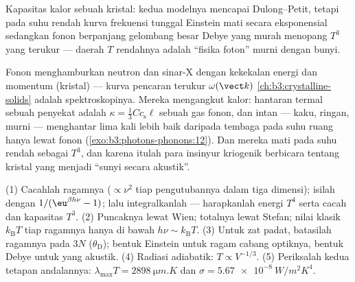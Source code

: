 \begin{omfigure}

{\small Kapasitas kalor sebuah kristal: kedua modelnya mencapai
Dulong--Petit, tetapi pada suhu rendah kurva frekuensi tunggal Einstein
mati secara eksponensial sedangkan fonon berpanjang gelombang besar
Debye yang murah menopang $T^3$ yang terukur --- daerah $T$ rendahnya
adalah ``fisika foton'' murni dengan bunyi.}
\end{omfigure}

\begin{example}\label{ex:b3:photons-phonons:phonon-real}
Fonon menghamburkan neutron dan sinar-X dengan kekekalan energi dan
momentum (kristal) --- kurva pencaran terukur
$\omega(\vect k)$ \cref{ch:b3:crystalline-solids} adalah
spektroskopinya. Mereka mengangkut kalor: hantaran termal sebuah
penyekat adalah $\kappa = \tfrac13 Cc_{\text{s}}\ell$ sebuah gas fonon, dan
intan --- kaku, ringan, murni --- menghantar lima kali lebih baik
daripada tembaga pada suhu ruang hanya lewat fonon
(\cref{exo:b3:photons-phonons:12}). Dan mereka mati pada suhu
rendah sebagai $T^3$, dan karena itulah para insinyur kriogenik
berbicara tentang kristal yang menjadi ``sunyi secara akustik''.
\end{example}

\begin{method}\label{met:b3:photons-phonons:method}
(1) Cacahlah ragamnya ($\propto\nu^2$ tiap pengutubannya dalam tiga
dimensi); isilah dengan $1/(\eu^{\beta h\nu} - 1)$; lalu
integralkanlah --- harapkanlah energi $T^4$ serta cacah dan kapasitas
$T^3$. (2) Puncaknya lewat Wien; totalnya lewat Stefan; nilai klasik
$k_{\text{B}}T$ tiap ragamnya hanya di bawah
$h\nu \sim k_{\text{B}}T$. (3) Untuk zat padat, batasilah ragamnya pada $3N$
($\theta_{\text{D}}$); bentuk Einstein untuk ragam cabang optiknya,
bentuk Debye untuk yang akustik. (4) Radiasi adiabatik: $T \propto
V^{-1/3}$. (5) Periksalah kedua tetapan andalannya: $\lambda_{
\max}T = \qty{2898}{\micro m.K}$ dan $\sigma =
\qty{5.67e-8}{W/m^2K^4}$.
\end{method}

